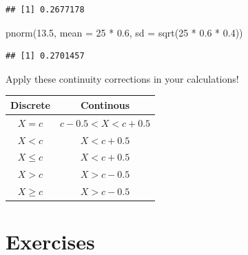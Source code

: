 \documentclass[
]{book}
\newenvironment{Shaded}{\begin{snugshade}}{\end{snugshade}}
\newcommand{\AttributeTok}[1]{\textcolor[rgb]{0.77,0.63,0.00}{#1}}
\newcommand{\DecValTok}[1]{\textcolor[rgb]{0.00,0.00,0.81}{#1}}
\newcommand{\FloatTok}[1]{\textcolor[rgb]{0.00,0.00,0.81}{#1}}
\newcommand{\FunctionTok}[1]{\textcolor[rgb]{0.00,0.00,0.00}{#1}}
\newcommand{\NormalTok}[1]{#1}
\newcommand{\SpecialCharTok}[1]{\textcolor[rgb]{0.00,0.00,0.00}{#1}}
\theoremstyle{definition}
\theoremstyle{definition}
\theoremstyle{definition}
\theoremstyle{definition}
\theoremstyle{remark}
\begin{document}
\begin{verbatim}
## [1] 0.2677178
\end{verbatim}

\begin{Shaded}
\begin{Highlighting}[]
\FunctionTok{pnorm}\NormalTok{(}\FloatTok{13.5}\NormalTok{, }\AttributeTok{mean =} \DecValTok{25} \SpecialCharTok{*} \FloatTok{0.6}\NormalTok{, }\AttributeTok{sd =} \FunctionTok{sqrt}\NormalTok{(}\DecValTok{25} \SpecialCharTok{*} \FloatTok{0.6} \SpecialCharTok{*} \FloatTok{0.4}\NormalTok{))}
\end{Highlighting}
\end{Shaded}

\begin{verbatim}
## [1] 0.2701457
\end{verbatim}

Apply these continuity corrections in your calculations!

\begin{longtable}[]{@{}cc@{}}
\toprule
Discrete & Continous \\
\midrule
\endhead
\(X=c\) & \(c-0.5 < X < c + 0.5\) \\
\(X<c\) & \(X < c + 0.5\) \\
\(X\leq c\) & \(X < c + 0.5\) \\
\(X>c\) & \(X>c-0.5\) \\
\(X\geq c\) & \(X>c-0.5\) \\
\bottomrule
\end{longtable}

\hypertarget{exercises-1}{%
\section{Exercises}\label{exercises-1}}
\end{document}
